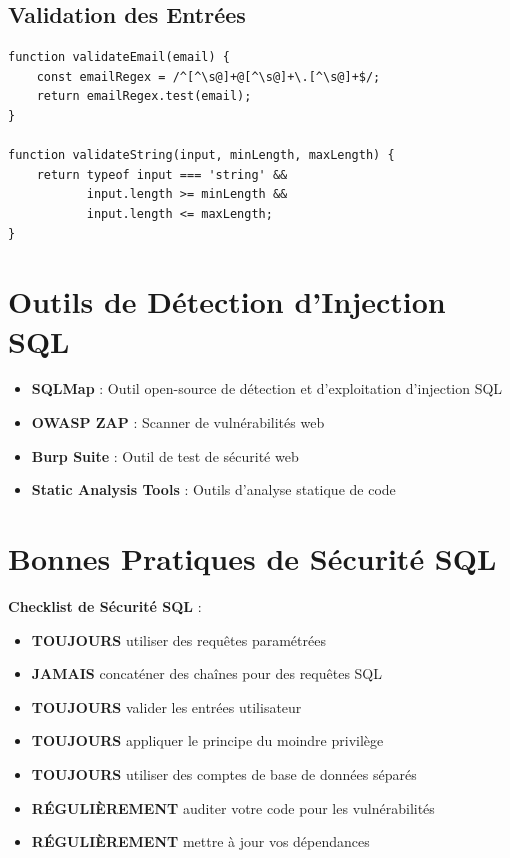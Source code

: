 \subsection{Validation des Entrées}

\begin{lstlisting}[style=javascript, caption=Validation des entrées]
function validateEmail(email) {
    const emailRegex = /^[^\s@]+@[^\s@]+\.[^\s@]+$/;
    return emailRegex.test(email);
}

function validateString(input, minLength, maxLength) {
    return typeof input === 'string' && 
           input.length >= minLength && 
           input.length <= maxLength;
}
\end{lstlisting}

\section{Outils de Détection d'Injection SQL}

\begin{itemize}
    \item \textbf{SQLMap} : Outil open-source de détection et d'exploitation d'injection SQL
    \item \textbf{OWASP ZAP} : Scanner de vulnérabilités web
    \item \textbf{Burp Suite} : Outil de test de sécurité web
    \item \textbf{Static Analysis Tools} : Outils d'analyse statique de code
\end{itemize}

\section{Bonnes Pratiques de Sécurité SQL}

\begin{bestpracticebox}
    \textbf{Checklist de Sécurité SQL} :
    \begin{itemize}
        \item \textbf{TOUJOURS} utiliser des requêtes paramétrées
        \item \textbf{JAMAIS} concaténer des chaînes pour des requêtes SQL
        \item \textbf{TOUJOURS} valider les entrées utilisateur
        \item \textbf{TOUJOURS} appliquer le principe du moindre privilège
        \item \textbf{TOUJOURS} utiliser des comptes de base de données séparés
        \item \textbf{RÉGULIÈREMENT} auditer votre code pour les vulnérabilités
        \item \textbf{RÉGULIÈREMENT} mettre à jour vos dépendances
    \end{itemize}
\end{bestpracticebox}

